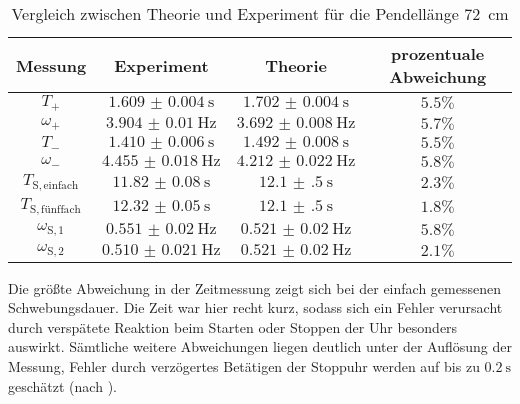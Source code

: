 \begin{table}
	\caption{Vergleich zwischen Theorie und Experiment für die Pendellänge 72 \,\si{\centi\meter}}
	\label{tab:discuss2}
	\begin{tabular}{cccc}
		\toprule
		Messung                    & Experiment               & Theorie                  & prozentuale Abweichung \\
		\midrule
		$T_{\mathrm{+}}$           & $\SI{1.609(4)}{\second}$ & $\SI{1.702(4)}{\second}$ & $5.5\%$                \\
		$\omega_{\mathrm{+}}$      & $\SI{3.904(10)}{\Hz}$     & $\SI{3.692(8)}{\Hz}$      & $5.7\%$                \\
		$T_{\mathrm{-}}$           & $\SI{1.410(6)}{\second}$  & $\SI{1.492(8)}{\second}$  & $5.5\% $               \\
		$\omega_{\mathrm{-}}$      & $\SI{4.455(18)}{\hertz}$      & $\SI{4.212(22)}{\Hz}$      & $5.8\%$                \\
		$T_{\mathrm{S,einfach}}$   & $\SI{11.82(8)}{\second}$   & $\SI{12.1(5)}{\second}$   & $2.3\%$                \\
		$T_{\mathrm{S,fünffach}}$ & $\SI{12.32(5)}{\second}$  & $\SI{12.1(5)}{\second}$   & $1.8\%$                \\
		$\omega_{\mathrm{S,1}}$      & $\SI{0.551(20)}{\Hz}$      & $\SI{0.521(20)}{\Hz}$      & $5.8\%$                \\
		$\omega_{\mathrm{S,2}}$      & $\SI{0.510(21)}{\Hz}$      & $\SI{0.521(20)}{\Hz}$      & $2.1\%$                \\

		\bottomrule
	\end{tabular}
\end{table}

Die größte Abweichung in der Zeitmessung zeigt sich bei der einfach gemessenen Schwebungsdauer. Die Zeit war hier recht kurz, sodass sich ein Fehler verursacht durch verspätete Reaktion beim Starten oder Stoppen der Uhr besonders auswirkt.
Sämtliche weitere Abweichungen liegen deutlich unter der Auflösung der Messung, Fehler durch verzögertes Betätigen der Stoppuhr werden auf bis zu $\SI{0.2}{\second}$ geschätzt (nach \cite{CS-Pro}).
